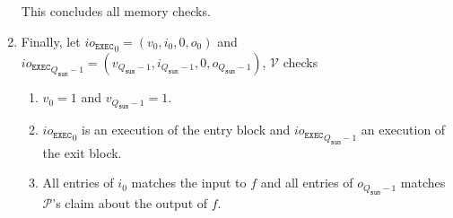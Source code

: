 \documentclass{article}
\newcommand{\Qsum}{Q_{\mathtt{sum}}}
\renewcommand{\P}{\mathcal{P}}
\newcommand{\V}{\mathcal{V}}
\newcommand{\ioe}{io_{\mathtt{EXEC}}}
\begin{document}
\begin{enumerate}
    This concludes all memory checks.
    \item Finally, let ${\ioe}_0 = (v_0, i_0, 0, o_0)$ and ${\ioe}_{\Qsum - 1} = (v_{\Qsum - 1}, i_{\Qsum - 1}, 0, o_{\Qsum - 1})$, $\V$ checks
    \begin{enumerate}
        \item $v_0 = 1$ and $v_{\Qsum - 1} = 1$.
        \item ${\ioe}_0$ is an execution of the entry block and ${\ioe}_{\Qsum - 1}$ an execution of the exit block.
        \item All entries of $i_0$ matches the input to $f$ and all entries of $o_{\Qsum - 1}$ matches $\P$'s claim about the output of $f$.
    \end{enumerate}
\end{enumerate}

\end{document}
